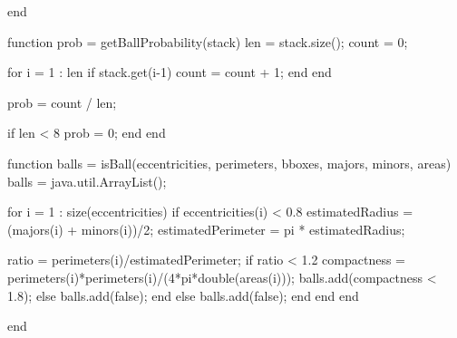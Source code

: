 \documentclass[10pt,a4paper]{article}
\begin{document}
\begin{verbatimtab}[2]
	end

	function prob = getBallProbability(stack)
		len = stack.size();
		count = 0;

		for i = 1 : len
			if stack.get(i-1)
				count = count + 1;
			end
		end

		prob = count / len;

		if len < 8
			prob = 0;
		end
	end

	function balls = isBall(eccentricities, perimeters, bboxes, majors, minors, areas)
		balls = java.util.ArrayList();

		for i = 1 : size(eccentricities)
			if eccentricities(i) < 0.8
				estimatedRadius = (majors(i) + minors(i))/2;
				estimatedPerimeter = pi * estimatedRadius;

				ratio = perimeters(i)/estimatedPerimeter;
				if ratio < 1.2
					compactness = perimeters(i)*perimeters(i)/(4*pi*double(areas(i)));
					balls.add(compactness < 1.8);
				else
					balls.add(false);
				end
			else
				balls.add(false);
			end
		end
	end

end
\end{verbatimtab}
\end{document}
